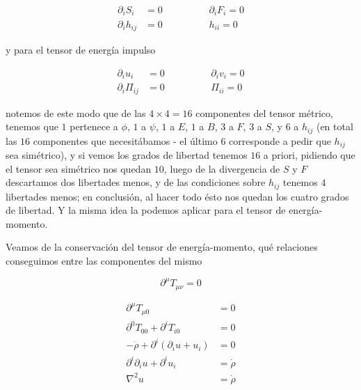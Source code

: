 \begin{equation}
    \begin{split}
        \partial_i S_i &= 0 \hspace{2cm} \partial_i F_i = 0\\
        \partial_i h_{ij} &= 0 \hspace{2cm} h_{ii} = 0
    \end{split}
\end{equation}

\noindent
y para el tensor de energía impulso

\begin{equation}
    \begin{split}
        \partial_i u_i &= 0 \hspace{2cm} \partial_i v_i = 0\\
        \partial_i \Pi_{ij} &= 0 \hspace{2cm} \Pi_{ii} = 0
    \end{split}
\end{equation}

\noindent
notemos de este modo que de las $4 \times 4 = 16$ componentes del tensor métrico, tenemos que $1$ pertenece a $\phi$, $1$ a $\psi$, $1$ a $E$, $1$ a $B$, $3$ a $F$, $3$ a $S$, y $6$ a $h_{ij}$ (en total las $16$ componentes que necesitábamos - el último $6$ corresponde a pedir que $h_{ij}$ sea simétrico), y si vemos los grados de libertad tenemos $16$ a priori, pidiendo que el tensor sea simétrico nos quedan $10$, luego de la divergencia de $S$ y $F$ descartamos dos libertades menos, y de las condiciones sobre $h_{ij}$ tenemos $4$ libertades menos; en conclusión, al hacer todo ésto nos quedan los cuatro grados de libertad. Y la misma idea la podemos aplicar para el tensor de energía-momento. 

Veamos de la conservación del tensor de energía-momento, qué relaciones conseguimos entre las componentes del mismo

\begin{equation}
    \partial^\mu T_{\mu \nu} = 0
\end{equation}

\begin{equation}
    \begin{split}
        \partial^\mu T_{\mu 0} &= 0\\
        \partial^0 T_{00} + \partial^i T_{i0} &= 0\\
        - \dot{\rho} + \partial^i \left( \partial_i u + u_i \right) &= 0\\
        \partial^i \partial_i u + \partial^i u_i &= \dot{\rho}\\
         \nabla^2 u &= \dot{\rho}
    \end{split}
\end{equation}

